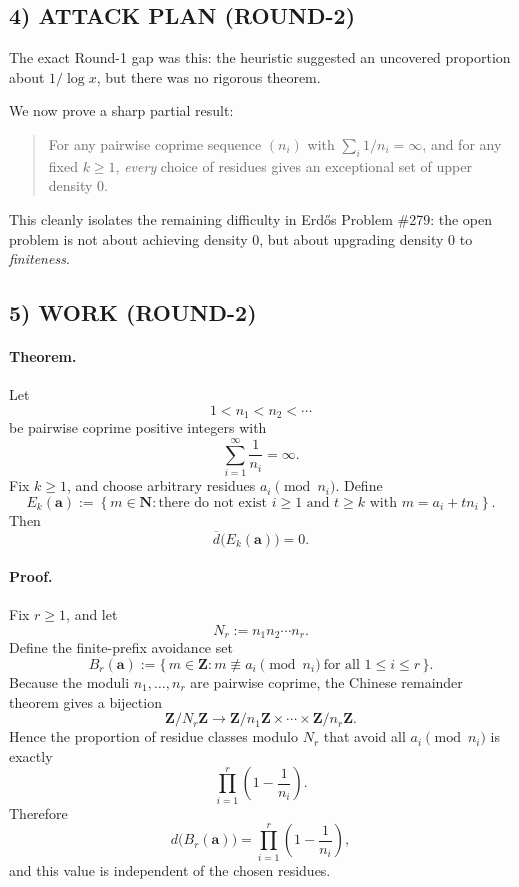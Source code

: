 \subsection*{4) ATTACK PLAN (ROUND-2)}

The exact Round-1 gap was this: the heuristic suggested an uncovered proportion about $1/\log x$, but there was no rigorous theorem.

We now prove a sharp partial result:

\begin{quote}
For any pairwise coprime sequence $(n_i)$ with $\sum_i 1/n_i=\infty$, and for any fixed $k\ge 1$, \emph{every} choice of residues gives an exceptional set of upper density $0$.
\end{quote}

This cleanly isolates the remaining difficulty in Erd\H{o}s Problem \#279: the open problem is not about achieving density $0$, but about upgrading density $0$ to \emph{finiteness}.

\subsection*{5) WORK (ROUND-2)}

\paragraph{Theorem.}
Let
\[
1<n_1<n_2<\cdots
\]
be pairwise coprime positive integers with
\[
\sum_{i=1}^\infty \frac{1}{n_i}=\infty.
\]
Fix $k\ge 1$, and choose arbitrary residues $a_i \pmod{n_i}$. Define
\[
E_k(\mathbf a)
:=
\left\{
m\in\mathbf N :
\text{there do not exist } i\ge 1 \text{ and } t\ge k \text{ with } m=a_i+t n_i
\right\}.
\]
Then
\[
\overline d\big(E_k(\mathbf a)\big)=0.
\]

\paragraph{Proof.}
Fix $r\ge 1$, and let
\[
N_r:=n_1n_2\cdots n_r.
\]
Define the finite-prefix avoidance set
\[
B_r(\mathbf a)
:=
\{\,m\in\mathbf Z : m\not\equiv a_i \pmod{n_i}\ \text{for all } 1\le i\le r\,\}.
\]
Because the moduli $n_1,\dots,n_r$ are pairwise coprime, the Chinese remainder theorem gives a bijection
\[
\mathbf Z/N_r\mathbf Z \longrightarrow
\mathbf Z/n_1\mathbf Z \times \cdots \times \mathbf Z/n_r\mathbf Z.
\]
Hence the proportion of residue classes modulo $N_r$ that avoid all $a_i \pmod{n_i}$ is exactly
\[
\prod_{i=1}^r \left(1-\frac{1}{n_i}\right).
\]
Therefore
\[
d\big(B_r(\mathbf a)\big)=\prod_{i=1}^r \left(1-\frac{1}{n_i}\right),
\]
and this value is independent of the chosen residues.

